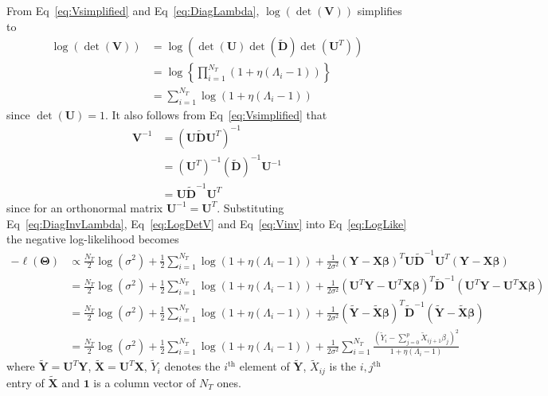 \documentclass[10pt,letterpaper]{article}
\newcommand{\tm}[1]{\textrm{{#1}}}
\newcommand{\bX}{\textbf{X}}
\newcommand{\bY}{\textbf{Y}}
\newcommand{\bD}{\textbf{D}}
\newcommand{\bXtilde}{\widetilde{\bX}}
\newcommand{\bYtilde}{\widetilde{\bY}}
\newcommand{\Xtilde}{\widetilde{X}}
\newcommand{\Ytilde}{\widetilde{Y}}
\newcommand{\bU}{\textbf{U}}
\newcommand{\bV}{\textbf{V}}
\newcommand{\bTheta}{\boldsymbol{\Theta}}
\newcommand{\bbeta}{\boldsymbol{\beta}}
\begin{document}
From Eq~\ref{eq:Vsimplified} and Eq~\ref{eq:DiagLambda}, $\log(\det(\bV))$ simplifies to
\begin{align}
\log(\det(\bV)) & =  \log  \left(  \det(\bU) \det\left(\widetilde{\bD}\right) \det(\bU^T)\right)   \nonumber \\
& =\log\left\lbrace \prod_{i=1}^{N_T}  \left( 1 + \eta (\Lambda_i-1) \right)  \right\rbrace \nonumber \\
& = \sum_{i=1}^{N_T} \log(1 + \eta (\Lambda_i-1)) \label{eq:LogDetV}
\end{align}
since $\det(\bU) = 1$. It also follows from Eq~\ref{eq:Vsimplified} that
\begin{align}
\bV^{-1} & = \left( \bU \widetilde{\bD} \bU^T \right)^{-1} \nonumber \\
& = \left( \bU^T \right)^{-1}  \left(\widetilde{\bD}\right)^{-1}    \bU^{-1} \nonumber \\
& = \bU \widetilde{\bD}^{-1} \bU^T \label{eq:Vinv}
\end{align}
since for an orthonormal matrix $\bU^{-1} = \bU^T$. Substituting Eq~\ref{eq:DiagInvLambda}, Eq~\ref{eq:LogDetV} and Eq~\ref{eq:Vinv} into Eq~\ref{eq:LogLike} the negative log-likelihood becomes
\begin{align}
-\ell(\bTheta) & \propto \frac{N_T}{2}\log(\sigma^2) + \frac{1}{2} \sum_{i=1}^{N_T} \log(1 + \eta (\Lambda_i-1)) + \frac{1}{2\sigma^2} \left(\bY - \bX \bbeta\right)^T \bU \widetilde{\bD}^{-1} \bU^T \left(\bY - \bX \bbeta\right) \label{eq:Likelihood} \\
& = \frac{N_T}{2}\log(\sigma^2) + \frac{1}{2} \sum_{i=1}^{N_T} \log(1 + \eta (\Lambda_i-1)) + \frac{1}{2\sigma^2} \left(\bU^T\bY - \bU^T\bX \bbeta\right)^T \widetilde{\bD}^{-1} \left(\bU^T\bY - \bU^T\bX \bbeta\right)  \nonumber\\
& = \frac{N_T}{2}\log(\sigma^2) + \frac{1}{2} \sum_{i=1}^{N_T} \log(1 + \eta (\Lambda_i-1)) + \frac{1}{2\sigma^2} \left(\bYtilde - \bXtilde \bbeta\right)^T \widetilde{\bD}^{-1} \left(\bYtilde - \bXtilde \bbeta\right)  \nonumber\\
& = \frac{N_T}{2}\log(\sigma^2) + \frac{1}{2} \sum_{i=1}^{N_T} \log(1 + \eta (\Lambda_i-1)) + \frac{1}{2\sigma^2} \sum_{i=1}^{N_T}\frac{\left(  \Ytilde_i - \sum_{j=0}^{p}\Xtilde_{ij+1}\beta_j \right) ^2}{1 + \eta (\Lambda_i-1)}  \label{eq:LikeFinal}
\end{align}
where $\bYtilde = \bU^T \bY$, $\bXtilde = \bU^T \bX$, $\Ytilde_i$ denotes the $i^{\tm{th}}$ element of $\bYtilde$, $\Xtilde_{ij}$ is the $i,j^{\tm{th}}$ entry of $\bXtilde$ and $\mathbf{1}$ is a column vector of $N_T$ ones.
\end{document}
